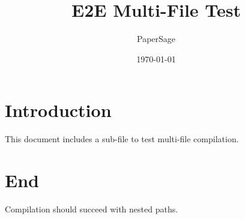 \documentclass{article}
\title{E2E Multi-File Test}
\author{PaperSage}
\date{\today}
\begin{document}
\maketitle

\section{Introduction}
This document includes a sub-file to test multi-file compilation.



\section{End}
Compilation should succeed with nested paths.
\end{document}
